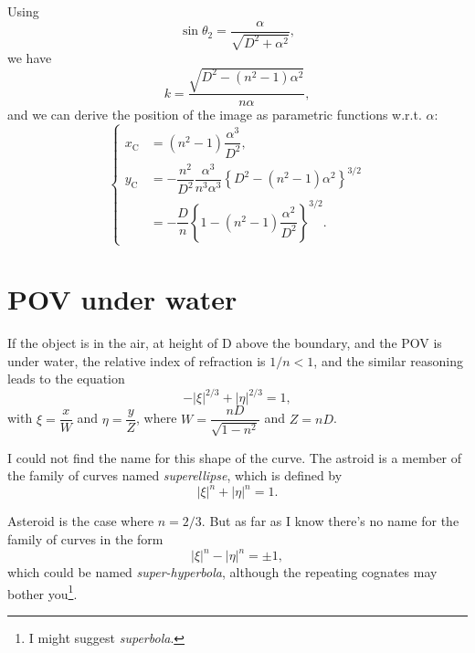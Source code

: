 \documentclass[twocolumn]{article}
\begin{document}
Using 
$$\sin\theta_2 = \dfrac{\alpha}{\sqrt{D^2+\alpha^2}},$$
we have
$$k = \dfrac{\sqrt{D^2-(n^2-1)\alpha^2}}{n\alpha},$$
and we can derive the position of the image as parametric functions w.r.t. $\alpha$:
$$ \left\{ 
\begin{aligned}
	x_{\mathrm{C}}^{} &= (n^2-1)\dfrac{\alpha^3}{D^2},\\
	y_{\mathrm{C}}^{} &= -\dfrac{n^2}{D^2}\dfrac{\alpha^3}{n^3\alpha^3}\left\{ D^2-(n^2-1)\alpha^2 \right\}^{3/2}\\
	&=-\dfrac{D}{n}\left\{ 1-(n^2-1)\dfrac{\alpha^2}{D^2} \right\}^{3/2}.
\end{aligned}
\right.$$

\section{POV under water}
If the object is in the air, at height of D above the boundary, and the POV
is under water, the relative index of refraction is $1/n < 1$, and the similar reasoning
leads to the equation
$$ - \left| \xi \right|^{2/3} + \left| \eta \right|^{2/3} = 1, $$
with $\xi = \dfrac{x}{W} $ and $\eta = \dfrac{y}{Z}$, where
$W = \dfrac{nD}{\sqrt{1-n^2}}$ and $Z = nD$.

I could not find the name for this shape of the curve. The astroid is a member of the 
family of curves named \emph{superellipse}, which is defined by 
$$ \left| \xi \right|^{n} + \left| \eta \right|^{n} = 1. $$

Asteroid is the case where $n=2/3$. But as far as I know there's no name for the 
family of curves in the form
$$ \left| \xi \right|^{n} - \left| \eta \right|^{n} = \pm 1, $$
which could be named \emph{super-hyperbola}, although the repeating cognates may 
bother you\footnote{I might suggest \emph{superbola}.}.
\end{document}
